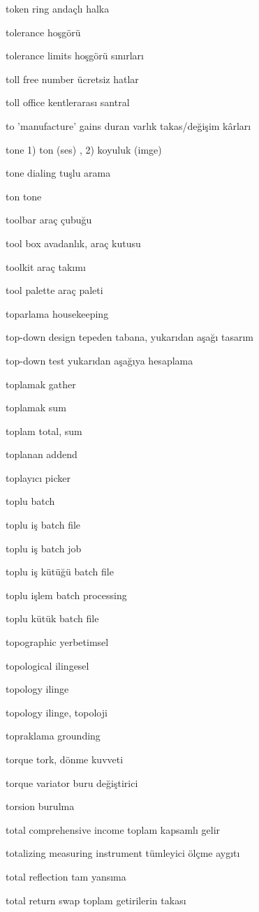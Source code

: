 \documentclass[12pt,fleqn]{article}\usepackage{../../common}
\begin{document}
token ring andaçlı halka

tolerance hoşgörü

tolerance limits hoşgörü sınırları

toll free number ücretsiz hatlar

toll office kentlerarası santral

to 'manufacture' gains duran varlık takas/değişim kârları

tone 1) ton (ses) , 2) koyuluk (imge)

tone dialing tuşlu arama

ton tone

toolbar araç çubuğu

tool box avadanlık, araç kutusu

toolkit araç takımı

tool palette araç paleti

toparlama housekeeping

top-down design tepeden tabana, yukarıdan aşağı tasarım

top-down test yukarıdan aşağıya hesaplama

toplamak gather

toplamak sum

toplam total, sum

toplanan addend

toplayıcı picker

toplu batch

toplu iş batch file

toplu iş batch job

toplu iş kütüğü batch file

toplu işlem batch processing

toplu kütük batch file

topographic yerbetimsel

topological ilingesel

topology ilinge

topology ilinge, topoloji

topraklama grounding

torque tork, dönme kuvveti

torque variator buru değiştirici

torsion burulma

total comprehensive income toplam kapsamlı gelir

totalizing measuring instrument tümleyici ölçme aygıtı

total reflection tam yansıma

total return swap toplam getirilerin takası
\end{document}

